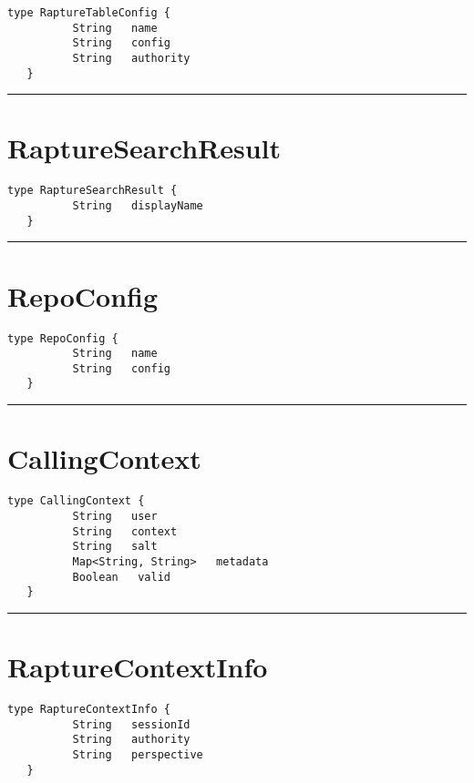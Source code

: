 \begin{lstlisting}[style=nonumbers]
   type RaptureTableConfig {
          String   name
          String   config
          String   authority
   }
\end{lstlisting}

\rule{12cm}{2pt}
\section{RaptureSearchResult}
\label{type:RaptureSearchResult}

\begin{lstlisting}[style=nonumbers]
   type RaptureSearchResult {
          String   displayName
   }
\end{lstlisting}

\rule{12cm}{2pt}
\section{RepoConfig}
\label{type:RepoConfig}

\begin{lstlisting}[style=nonumbers]
   type RepoConfig {
          String   name
          String   config
   }
\end{lstlisting}

\rule{12cm}{2pt}
\section{CallingContext}
\label{type:CallingContext}

\begin{lstlisting}[style=nonumbers]
   type CallingContext {
          String   user
          String   context
          String   salt
          Map<String, String>   metadata
          Boolean   valid
   }
\end{lstlisting}

\rule{12cm}{2pt}
\section{RaptureContextInfo}
\label{type:RaptureContextInfo}

\begin{lstlisting}[style=nonumbers]
   type RaptureContextInfo {
          String   sessionId
          String   authority
          String   perspective
   }
\end{lstlisting}

